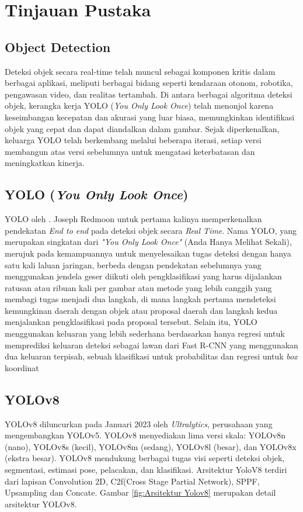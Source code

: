 \section{Tinjauan Pustaka}
\label{sec:tinjauanpustaka}

\subsection{Object Detection}
Deteksi objek secara real-time telah muncul sebagai komponen kritis dalam berbagai aplikasi, meliputi berbagai bidang seperti kendaraan otonom, robotika, pengawasan video, dan realitas tertambah. Di antara berbagai algoritma deteksi objek, kerangka kerja YOLO (\emph{You Only Look Once}) telah menonjol karena keseimbangan kecepatan dan akurasi yang luar biasa, memungkinkan identifikasi objek yang cepat dan dapat diandalkan dalam gambar. Sejak diperkenalkan, keluarga YOLO telah berkembang melalui beberapa iterasi, setiap versi membangun atas versi sebelumnya untuk mengatasi keterbatasan dan meningkatkan kinerja.

\subsection{YOLO (\emph{You Only Look Once})}
YOLO oleh \cite{YOLO}. Joseph Redmoon untuk pertama kalinya memperkenalkan pendekatan \emph{End to end} pada deteksi objek secara \emph{Real Time}. Nama YOLO, yang merupakan singkatan dari \emph{"You Only Look Once"} (Anda Hanya Melihat Sekali), merujuk pada kemampuannya untuk menyelesaikan tugas deteksi dengan hanya satu kali laluan jaringan, berbeda dengan pendekatan sebelumnya yang menggunakan jendela geser diikuti oleh pengklasifikasi yang harus dijalankan ratusan atau ribuan kali per gambar atau metode yang lebih canggih yang membagi tugas menjadi dua langkah, di mana langkah pertama mendeteksi kemungkinan daerah dengan objek atau proposal daerah dan langkah kedua menjalankan pengklasifikasi pada proposal tersebut. Selain itu, YOLO menggunakan keluaran yang lebih sederhana berdasarkan hanya regresi untuk memprediksi keluaran deteksi sebagai lawan dari Fast R-CNN yang menggunakan dua keluaran terpisah, sebuah klasifikasi untuk probabilitas dan regresi untuk \emph{box} koordinat\cite{YOLO}

\subsection{YOLOv8}
YOLOv8 diluncurkan pada Januari 2023 oleh \emph{Ultralytics}, perusahaan yang mengembangkan YOLOv5. YOLOv8 menyediakan lima versi skala: YOLOv8n (nano), YOLOv8s (kecil), YOLOv8m (sedang), YOLOv8l (besar), dan YOLOv8x (ekstra besar). YOLOv8 mendukung berbagai tugas visi seperti deteksi objek, segmentasi, estimasi pose, pelacakan, dan klasifikasi\cite{Yolov8}. Arsitektur YoloV8 terdiri dari lapisan Convolution 2D, C2f(Cross Stage Partial Network), SPPF, Upsampling dan Concate. Gambar \ref{fig:Arsitektur Yolov8} merupakan detail arsitektur YOLOv8.

